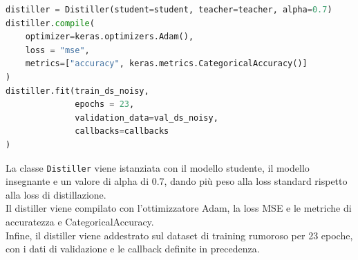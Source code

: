\documentclass[12pt,a4paper,openright,twoside]{book}
\begin{document}
\begin{lstlisting}[language=Python, caption={Definizione della callback per Distiller}, label={lst:distill_cb}]
distiller = Distiller(student=student, teacher=teacher, alpha=0.7)
distiller.compile(
    optimizer=keras.optimizers.Adam(),
    loss = "mse",
    metrics=["accuracy", keras.metrics.CategoricalAccuracy()]
)
distiller.fit(train_ds_noisy,
              epochs = 23,
              validation_data=val_ds_noisy,
              callbacks=callbacks
)
\end{lstlisting}
La classe \texttt{Distiller} viene istanziata con il modello studente, il modello insegnante e un valore di alpha di 0.7, dando più peso alla loss standard rispetto alla loss di distillazione.\\
Il distiller viene compilato con l'ottimizzatore Adam, la loss MSE e le metriche di accuratezza e CategoricalAccuracy.\\
Infine, il distiller viene addestrato sul dataset di training rumoroso per 23 epoche, con i dati di validazione e le callback definite in precedenza.
\end{document}
